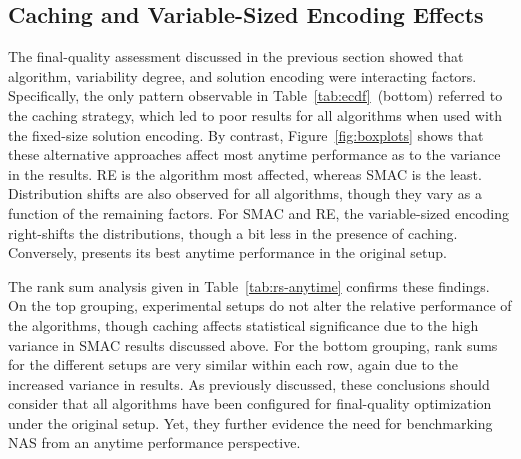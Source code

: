 \subsection{Caching and Variable-Sized Encoding Effects}
The final-quality assessment discussed in the previous section showed that algorithm, variability degree, and solution encoding were interacting factors. Specifically, the only pattern observable in Table~\ref{tab:ecdf}~(bottom) referred to the caching strategy, which led to poor results for all algorithms when used with the fixed-size solution encoding. By contrast, Figure~\ref{fig:boxplots} shows that these alternative approaches affect most anytime performance as to the variance in the results. RE is the algorithm most affected, whereas SMAC is the least. Distribution shifts are also observed for all algorithms, though they vary as a function of the remaining factors. For SMAC and RE, the variable-sized encoding right-shifts the distributions, though a bit less in the presence of caching. Conversely, \irace presents its best anytime performance in the original \nasbench setup. 

The rank sum analysis given in Table~\ref{tab:rs-anytime} confirms these findings. On the top grouping, experimental setups do not alter the relative performance of the algorithms, though caching affects statistical significance due to the high variance in SMAC results discussed above. For the bottom grouping, rank sums for the different setups are very similar within each row, again due to the increased variance in results. As previously discussed, these conclusions should consider that all algorithms have been configured for final-quality optimization under the original setup. Yet, they further evidence the need for benchmarking NAS from an anytime performance perspective.


